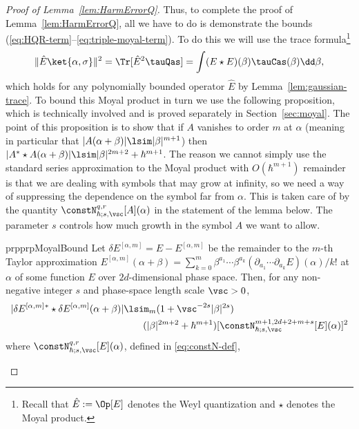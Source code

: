 \documentclass{article}
\numberwithin{equation}{section}
\begin{document}
\begin{proof}[Proof of Lemma~\ref{lem:HarmErrorQ}]
Thus, to complete the proof of Lemma~\ref{lem:HarmErrorQ}, all we have to do is demonstrate the bounds (\ref{eq:HQR-term}--\ref{eq:triple-moyal-term}).
To do this we will use the trace formula\footnote{Recall that $\hat{E}:=\Op[E]$ denotes the Weyl quantization and $\star $ denotes the Moyal product.}
\begin{equation}
    \label{eq:trace-to-moyal}
    \|\hat{E} \ket{\alpha,\sigma}\|^2
    = \Tr[ \hat{E}^2 \tauQas]
    = \int (E\star E)(\beta) \tauCas(\beta) \dd \beta,
\end{equation}
which holds for any polynomially bounded operator $\hat{E}$ by Lemma~\ref{lem:gaussian-trace}. To bound this Moyal product in turn we use the following proposition, 
which is technically involved and is proved separately in Section~\ref{sec:moyal}.   The point of this proposition
is to show that if $A$ vanishes to order $m$ at $\alpha$ (meaning in 
particular that $|A(\alpha+\beta)| \lsim |\beta|^{m+1}$) then
$|A^*\star A(\alpha+\beta)|\lsim |\beta|^{2m+2} + \hbar^{m+1}$.  The reason we cannot simply use the standard
series approximation to the Moyal product with $O(\hbar^{m+1})$
remainder is that we are dealing with symbols that may grow 
at infinity, so we need a way of suppressing the dependence 
on the symbol far from $\alpha$.  This is taken care
of by the quantity $\constN_{\hbar;s,\vsc}^{q,r}[A](\alpha)$
in the statement of the lemma below.  The parameter $s$ controls how much growth in the symbol $A$ we want to allow.
	\begin{restatable}{prp}{prpMoyalBound}
		\label{prp:moyalBound}
		Let $\delta E^{[\alpha,m]} = E - E^{[\alpha,m]}$ be the remainder to the $m$-th Taylor approximation 
		$E^{[\alpha,m]}(\alpha+\beta) = \sum_{k=0}^{m} \beta^{a_1}\cdots \beta^{a_k} (\partial_{a_1} \cdots \partial_{a_k} E)(\alpha)/k!$ 
		at $\alpha$ of some function $E$ over $2d$-dimensional phase space.
		Then, for any non-negative integer $s$ and phase-space length scale $\vsc>0$,
		\begin{equation}
  \begin{split}
			\label{eq:remainder-moyal-bd}
			|\delta E^{[\alpha,m]} {}^*\star \delta E^{[\alpha,m]}(\alpha+\beta)| 
			&\lsim_m
			(1+\vsc^{-2s}|\beta|^{2s})\\&\qquad (|\beta|^{2m+2} + \hbar^{m+1})
			[\constN_{\hbar;s,\vsc}^{m+1,2d+2+m+s}[E](\alpha)]^2
   \end{split}
		\end{equation}
		where $\constN_{\hbar;s,\vsc}^{q,r}[E](\alpha)$, defined in \eqref{eq:constN-def}, 

\end{restatable}
\end{proof}
\end{document}
